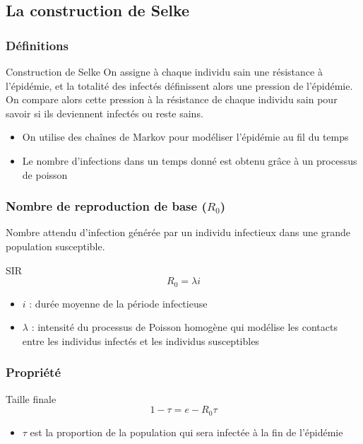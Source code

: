 \subsection{La construction de Selke}

\begin{frame}
    \frametitle{Définitions}

    \begin{block}{Construction de Selke}
        On assigne à chaque individu sain une résistance à l'épidémie, et la totalité des infectés définissent alors une pression de l'épidémie. On compare alors cette pression à la résistance de chaque individu sain pour savoir si ils deviennent infectés ou reste sains.
    \end{block}

    \begin{itemize}
        \item On utilise des chaînes de Markov pour modéliser l'épidémie au fil du temps
        \item Le nombre d'infections dans un temps donné est obtenu grâce à un processus de poisson
    \end{itemize}
\end{frame}

\begin{frame}
        \frametitle{Nombre de reproduction de base ($R_0$)}

        Nombre attendu d’infection générée par un individu infectieux dans une grande population susceptible.

        \begin{alertblock}{SIR}
                $$ R_0 =  \lambda i $$
        \end{alertblock}

        \begin{itemize}
                \item $i$ : durée moyenne de la période infectieuse
                \item $\lambda$ : intensité du processus de Poisson homogène qui modélise les contacts entre les individus infectés et les individus susceptibles
        \end{itemize}
\end{frame}

\begin{frame}
    \frametitle{Propriété}

    \begin{block}{Taille finale}
        $$ 1 - \tau = e - R_0\tau $$
    \end{block}

    \begin{itemize}
        \item $\tau$ est la proportion de la population qui sera infectée à la fin de l’épidémie
    \end{itemize}
\end{frame}



